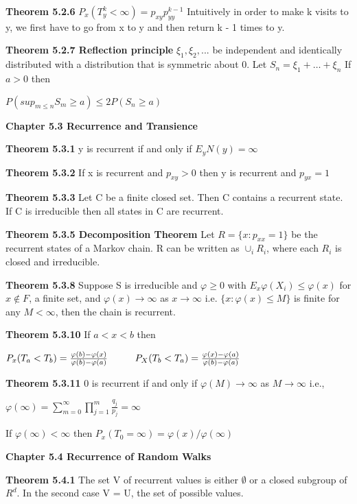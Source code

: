 \documentclass{article}
\newcommand\tab[1][1cm]{\hspace*{#1}}
\begin{document}
\textbf {Theorem 5.2.6} $P_x (T_y^k < \infty) = p_{xy} p_{yy}^{k-1}$
Intuitively in order to make k visits to y, we first have to go from x to y and then return k - 1 times to y.

\textbf {Theorem 5.2.7 Reflection principle} $\xi_1, \xi_2 ,...$ be independent and identically distributed with a distribution that is symmetric about 0. Let $S_n = \xi_1 + \dots + \xi_n$ If $a > 0$ then 
\begin{center}
$P(sup_{m \leq n} S_m \geq a ) \leq 2P(S_n \geq a)$
\end{center}

\textbf {Chapter 5.3 Recurrence and Transience}

\textbf {Theorem 5.3.1} y is recurrent if and only if $E_y N(y) = \infty$

\textbf {Theorem 5.3.2} If x is recurrent and $p_{xy} > 0$ then y is recurrent and $p_{yx} = 1$

\textbf {Theorem 5.3.3} Let C be a finite closed set. Then C contains a recurrent state. If C  is irreducible then all states in C are recurrent.

\textbf {Theorem 5.3.5 Decomposition Theorem} Let $R = \{ x : p_{xx} = 1 \}$ be the recurrent states of a Markov chain. R can be written as $\cup_i R_i$, where each $R_i$ is closed and irreducible.

\textbf {Theorem 5.3.8} Suppose S is irreducible and $\varphi \geq 0$ with $E_x \varphi(X_i) \leq \varphi(x)$ for $x \notin F$, a finite set, and $\varphi(x) \to \infty$ as $x \to \infty$ i.e. $\{x : \varphi(x) \leq M \}$ is finite for any $M < \infty$, then the chain is recurrent.

\textbf {Theorem 5.3.10} If $a < x < b$ then
\begin{center}
$P_x (T_a < T_b) = \frac{\varphi(b) - \varphi(x)}{\varphi(b) - \varphi(a)} \tab P_X(T_b < T_a) = \frac{\varphi(x) - \varphi(a)}{\varphi(b) - \varphi(a)}$
\end{center}

\textbf {Theorem 5.3.11} 0 is recurrent if and only if $\varphi(M) \to \infty$ as $M \to \infty$ i.e.,
\begin{center}
$\varphi(\infty) = \sum_{m=0}^{\infty} \prod_{j=1}^m \frac{q_j}{p_j} = \infty$
\end{center}
If $\varphi(\infty) < \infty$ then $P_x(T_0 = \infty) = \varphi(x)/\varphi(\infty)$

\textbf {Chapter 5.4 Recurrence of Random Walks}

\textbf {Theorem 5.4.1} The set V of recurrent values is either $\emptyset$ or a closed subgroup of $R^d$. In the second case V = U, the set of possible values.
\end{document}
